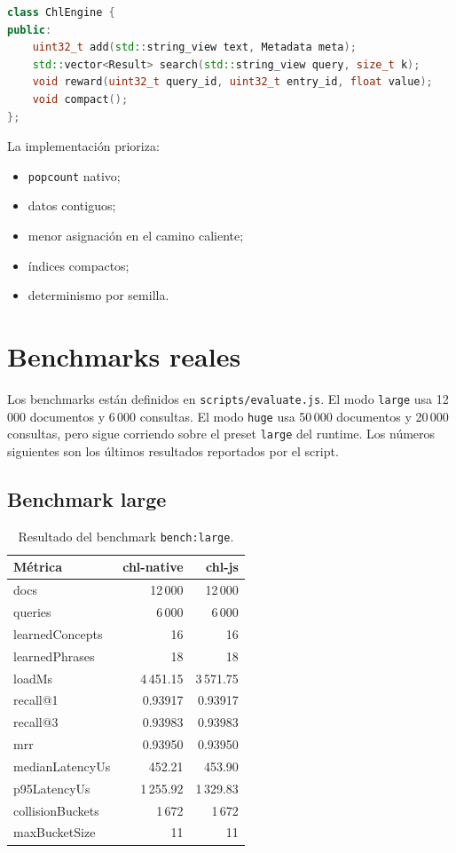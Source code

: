 \documentclass[11pt]{article}
\begin{document}
\begin{lstlisting}[language=C++,caption={Esquema conceptual del motor en el addon nativo.}]
class ChlEngine {
public:
    uint32_t add(std::string_view text, Metadata meta);
    std::vector<Result> search(std::string_view query, size_t k);
    void reward(uint32_t query_id, uint32_t entry_id, float value);
    void compact();
};
\end{lstlisting}

La implementación prioriza:
\begin{itemize}
  \item \texttt{popcount} nativo;
  \item datos contiguos;
  \item menor asignación en el camino caliente;
  \item índices compactos;
  \item determinismo por semilla.
\end{itemize}

\section{Benchmarks reales}

Los benchmarks están definidos en \texttt{scripts/evaluate.js}. El modo \texttt{large} usa 12\,000 documentos y 6\,000 consultas. El modo \texttt{huge} usa 50\,000 documentos y 20\,000 consultas, pero sigue corriendo sobre el preset \texttt{large} del runtime. Los números siguientes son los últimos resultados reportados por el script.

\subsection{Benchmark large}

\begin{table}[h]
\centering
\small
\begin{tabular}{lrr}
\toprule
\textbf{Métrica} & \textbf{chl-native} & \textbf{chl-js} \\
\midrule
docs & 12\,000 & 12\,000 \\
queries & 6\,000 & 6\,000 \\
learnedConcepts & 16 & 16 \\
learnedPhrases & 18 & 18 \\
loadMs & 4\,451.15 & 3\,571.75 \\
recall@1 & 0.93917 & 0.93917 \\
recall@3 & 0.93983 & 0.93983 \\
mrr & 0.93950 & 0.93950 \\
medianLatencyUs & 452.21 & 453.90 \\
p95LatencyUs & 1\,255.92 & 1\,329.83 \\
collisionBuckets & 1\,672 & 1\,672 \\
maxBucketSize & 11 & 11 \\
\bottomrule
\end{tabular}
\caption{Resultado del benchmark \texttt{bench:large}.}
\end{table}
\end{document}
